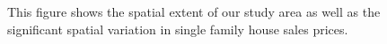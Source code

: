 \documentclass{article}\usepackage[]{graphicx}\usepackage[]{color}
\begin{document}
\begin{figure}
\caption{This figure shows the spatial extent of our study area as well as the significant spatial variation in single family house sales prices.}\label{fig:overview}
\end{figure}
\end{document}
